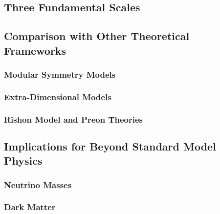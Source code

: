\documentclass[11pt,a4paper]{article}
\begin{document}
\subsection{Three Fundamental Scales}

\subsection{Comparison with Other Theoretical Frameworks}

\subsubsection{Modular Symmetry Models}

\subsubsection{Extra-Dimensional Models}

\subsubsection{Rishon Model and Preon Theories}

\subsection{Implications for Beyond Standard Model Physics}

\subsubsection{Neutrino Masses}

\subsubsection{Dark Matter}
\end{document}

